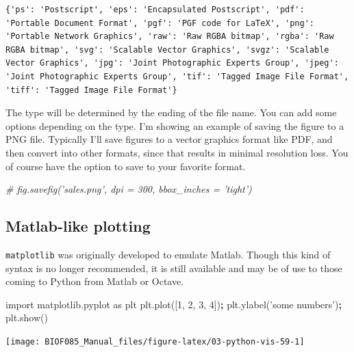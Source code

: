 \documentclass[
  letterpaper,
]{scrbook}
\newenvironment{Shaded}{\begin{snugshade}}{\end{snugshade}}
\newcommand{\CommentTok}[1]{\textcolor[rgb]{0.56,0.35,0.01}{\textit{#1}}}
\newcommand{\DecValTok}[1]{\textcolor[rgb]{0.00,0.00,0.81}{#1}}
\newcommand{\ImportTok}[1]{#1}
\newcommand{\NormalTok}[1]{#1}
\newcommand{\OperatorTok}[1]{\textcolor[rgb]{0.81,0.36,0.00}{\textbf{#1}}}
\newcommand{\StringTok}[1]{\textcolor[rgb]{0.31,0.60,0.02}{#1}}
\begin{document}
\begin{verbatim}
{'ps': 'Postscript', 'eps': 'Encapsulated Postscript', 'pdf': 'Portable Document Format', 'pgf': 'PGF code for LaTeX', 'png': 'Portable Network Graphics', 'raw': 'Raw RGBA bitmap', 'rgba': 'Raw RGBA bitmap', 'svg': 'Scalable Vector Graphics', 'svgz': 'Scalable Vector Graphics', 'jpg': 'Joint Photographic Experts Group', 'jpeg': 'Joint Photographic Experts Group', 'tif': 'Tagged Image File Format', 'tiff': 'Tagged Image File Format'}
\end{verbatim}

The type will be determined by the ending of the file name. You can add some options depending on the type. I'm showing an example of saving the figure to a PNG file. Typically I'll save figures to a vector graphics format like PDF, and then convert into other formats, since that results in minimal resolution loss. You of course have the option to save to your favorite format.

\begin{Shaded}
\begin{Highlighting}[]
\CommentTok{# fig.savefig('sales.png', dpi = 300, bbox_inches = 'tight') }
\end{Highlighting}
\end{Shaded}

\hypertarget{matlab-like-plotting}{%
\subsection{Matlab-like plotting}\label{matlab-like-plotting}}

\texttt{matplotlib} was originally developed to emulate Matlab. Though this kind of syntax is no longer recommended, it is still available and may be of use to those coming to Python from Matlab or Octave.

\begin{Shaded}
\begin{Highlighting}[]
\ImportTok{import}\NormalTok{ matplotlib.pyplot }\ImportTok{as}\NormalTok{ plt}
\NormalTok{plt.plot([}\DecValTok{1}\NormalTok{, }\DecValTok{2}\NormalTok{, }\DecValTok{3}\NormalTok{, }\DecValTok{4}\NormalTok{])}\OperatorTok{;}
\NormalTok{plt.ylabel(}\StringTok{'some numbers'}\NormalTok{)}\OperatorTok{;}
\NormalTok{plt.show()}
\end{Highlighting}
\end{Shaded}

\begin{center}\texttt{[image: BIOF085\_Manual\_files/figure-latex/03-python-vis-59-1]} \end{center}
\end{document}
